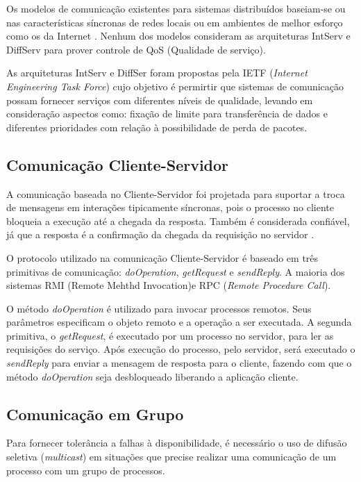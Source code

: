 \documentclass[
	12pt,				%
	oneside,			%
	a4paper,			%
	english,			%
	brazil				%
	]{abntex2ppgsi}
\begin{document}
Os modelos de comunicação existentes para sistemas distribuídos baseiam-se ou nas características síncronas de redes locais ou em ambientes de melhor esforço como os da Internet \cite{gorender2002modelo}. Nenhum dos modelos consideram as arquiteturas IntServ e DiffServ para prover controle de QoS (Qualidade de serviço).

As arquiteturas IntServ e DiffSer foram propostas pela IETF (\textit{Internet Engineering Task Force}) cujo objetivo  é permirtir que sistemas de comunicação possam fornecer serviços com diferentes níveis de qualidade, levando em consideração aspectos como: fixação de limite para transferência de dados e diferentes prioridades com relação à possibilidade de perda de pacotes.

\subsection{Comunicação Cliente-Servidor}

A comunicação baseada no Cliente-Servidor foi projetada para suportar a troca de mensagens em interações tipicamente síncronas, pois o processo no cliente bloqueia a execução até a chegada da resposta. Também é considerada confiável, já que a resposta é a confirmação da chegada da requisição no servidor \cite{coulouris2013sistemas}.

O protocolo utilizado na comunicação Cliente-Servidor é baseado em três primitivas de comunicação: \textit{doOperation}, \textit{getRequest} e \textit{sendReply}. A maioria dos sistemas RMI (Remote Mehthd Invocation)e RPC (\textit{Remote Procedure Call}).

O método \textit{doOperation} é utilizado para invocar processos remotos. Seus parâmetros especificam  o objeto remoto e a operação a ser executada. A segunda primitiva, o \textit{getRequest}, é executado por um processo no servidor, para ler as requisições do serviço. Após execução do processo, pelo servidor, será executado o \textit{sendReply} para enviar a mensagem de resposta para o cliente, fazendo com que o método \textit{doOperation} seja desbloqueado liberando a aplicação cliente.

\subsection{Comunicação em Grupo}

Para fornecer tolerância a falhas à disponibilidade, é necessário o uso de difusão seletiva (\textit{multicast}) em situações que precise realizar uma comunicação de um processo com um grupo de processos.
\end{document}
